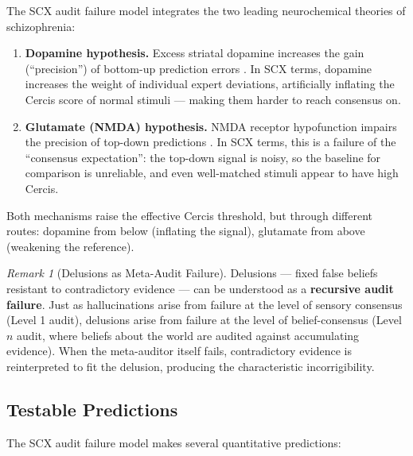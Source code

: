 \documentclass[12pt,a4paper]{article}
\theoremstyle{remark}
\newtheorem{remark}[theorem]{Remark}
\newcommand{\Cercis}{\textsf{Cercis}}
\begin{document}
The SCX audit failure model integrates the two leading neurochemical theories
of schizophrenia:

\begin{enumerate}[label=(\roman*)]
    \item \textbf{Dopamine hypothesis.} Excess striatal dopamine increases
          the gain (``precision'') of bottom-up prediction errors
          \cite{howes2009dopamine, kapur2003psychosis}. In SCX terms, dopamine
          increases the weight of individual expert deviations, artificially
          inflating the \Cercis{} score of normal stimuli --- making them harder
          to reach consensus on.
    \item \textbf{Glutamate (NMDA) hypothesis.} NMDA receptor hypofunction
          impairs the precision of top-down predictions \cite{coyle2006glutamate,
          corlett2011glutamatergic}. In SCX terms, this is a failure of the
          ``consensus expectation'': the top-down signal is noisy, so the
          baseline for comparison is unreliable, and even well-matched stimuli
          appear to have high \Cercis{}.
\end{enumerate}

Both mechanisms raise the effective \Cercis{} threshold, but through different
routes: dopamine from below (inflating the signal), glutamate from above
(weakening the reference).

\begin{remark}[Delusions as Meta-Audit Failure]
Delusions --- fixed false beliefs resistant to contradictory evidence --- can
be understood as a \textbf{recursive audit failure}. Just as hallucinations
arise from failure at the level of sensory consensus (Level 1 audit), delusions
arise from failure at the level of belief-consensus (Level $n$ audit, where
beliefs about the world are audited against accumulating evidence). When the
meta-auditor itself fails, contradictory evidence is reinterpreted to fit the
delusion, producing the characteristic incorrigibility.
\end{remark}

\subsection{Testable Predictions}

The SCX audit failure model makes several quantitative predictions:
\end{document}
